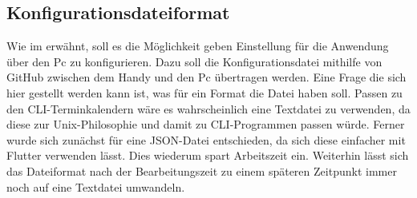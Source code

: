 \subsection{Konfigurationsdateiformat}\label{section:tech:sub:konfigurationsdateiformat}%
Wie im  erwähnt, soll es die Möglichkeit geben Einstellung für die Anwendung über den Pc zu konfigurieren. Dazu soll die Konfigurationsdatei mithilfe von GitHub zwischen dem Handy und den Pc übertragen werden.\newline%
Eine Frage die sich hier gestellt werden kann ist, was für ein Format die Datei haben soll.\newline%
Passen zu den CLI-Terminkalendern wäre es wahrscheinlich eine Textdatei zu verwenden, da diese zur Unix-Philosophie\cite{tech_unix-philosophie} und damit zu CLI-Programmen passen würde. %
Ferner wurde sich zunächst für eine JSON-Datei entschieden, da sich diese einfacher mit Flutter verwenden lässt. Dies wiederum spart Arbeitszeit ein. %
Weiterhin lässt sich das Dateiformat nach der Bearbeitungszeit zu einem späteren Zeitpunkt immer noch auf eine Textdatei umwandeln.%
